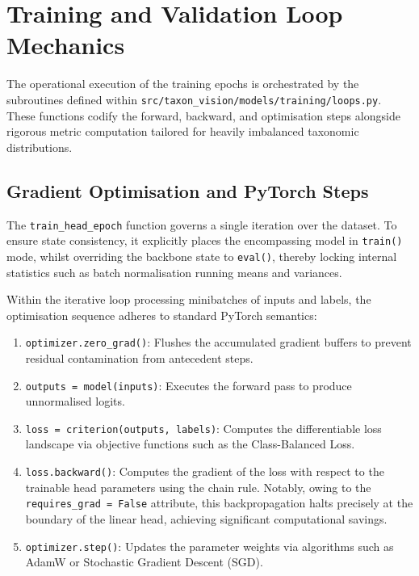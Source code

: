 \section{Training and Validation Loop Mechanics}
\label{sec:training_validation_loops}

The operational execution of the training epochs is orchestrated by the subroutines defined within \texttt{src/taxon\_vision/models/training/loops.py}. These functions codify the forward, backward, and optimisation steps alongside rigorous metric computation tailored for heavily imbalanced taxonomic distributions.

\subsection{Gradient Optimisation and PyTorch Steps}

The \texttt{train\_head\_epoch} function governs a single iteration over the dataset. To ensure state consistency, it explicitly places the encompassing model in \texttt{train()} mode, whilst overriding the backbone state to \texttt{eval()}, thereby locking internal statistics such as batch normalisation running means and variances.

Within the iterative loop processing minibatches of inputs and labels, the optimisation sequence adheres to standard PyTorch semantics:

\begin{enumerate}
    \item \texttt{optimizer.zero\_grad()}: Flushes the accumulated gradient buffers to prevent residual contamination from antecedent steps.
    \item \texttt{outputs = model(inputs)}: Executes the forward pass to produce unnormalised logits.
    \item \texttt{loss = criterion(outputs, labels)}: Computes the differentiable loss landscape via objective functions such as the Class-Balanced Loss.
    \item \texttt{loss.backward()}: Computes the gradient of the loss with respect to the trainable head parameters using the chain rule. Notably, owing to the \texttt{requires\_grad = False} attribute, this backpropagation halts precisely at the boundary of the linear head, achieving significant computational savings.
    \item \texttt{optimizer.step()}: Updates the parameter weights via algorithms such as AdamW or Stochastic Gradient Descent (SGD).
\end{enumerate}

